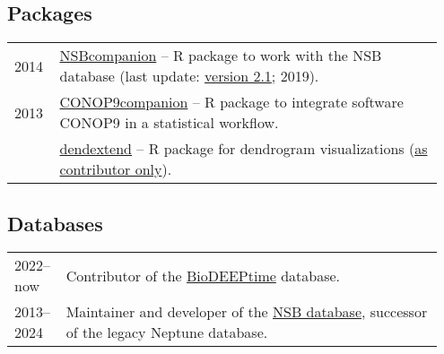 \documentclass[11pt, a4paper]{article}
\begin{document}
\subsection{Packages}
\begin{longtable}{@{}p{0.1\linewidth} >{\small}P{0.85\linewidth}@{}}
2014 & \href{http://github.com/plannapus/NSBcompanion}{NSBcompanion} -- R package to work with the NSB database (last update: \href{http://doi.org/10.5281/zenodo.3408198}{version 2.1}; 2019).\\
2013 & \href{http://github.com/plannapus/CONOP9companion}{CONOP9companion} -- R package to integrate software CONOP9 in a statistical workflow.\\
     & \href{https://cran.r-project.org/web/packages/dendextend/index.html}{dendextend} -- R package for dendrogram visualizations (\underline{as contributor only}).\\
\end{longtable}
\subsection{Databases}
\begin{longtable}{@{}p{0.1\linewidth} >{\small}P{0.85\linewidth}@{}}
2022--now & Contributor of the \href{https://zenodo.org/record/7504616}{BioDEEPtime} database.\\
2013--2024 & Maintainer and developer of the \href{http://nsb-mfn-berlin.de/}{NSB database}, successor of the legacy Neptune database.\\
\end{longtable}
\end{document}
